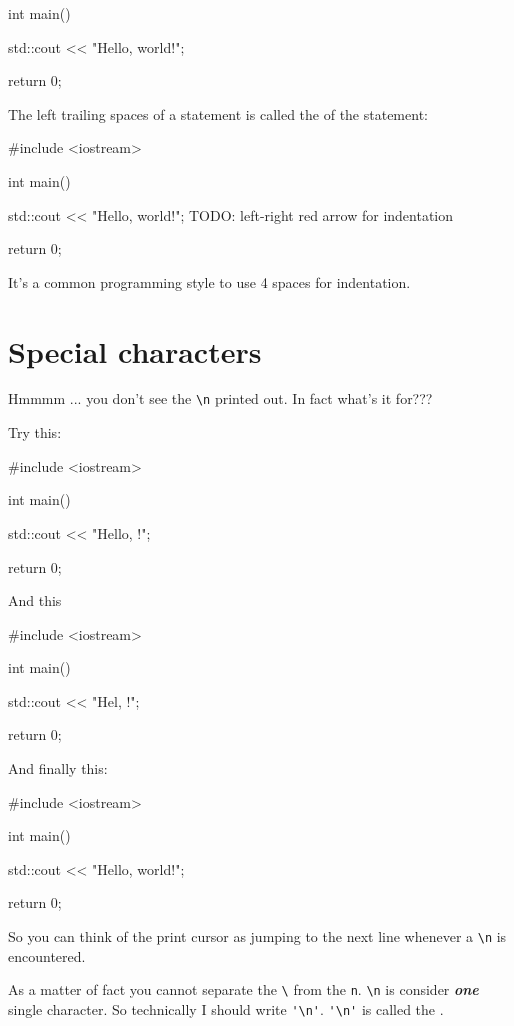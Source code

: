 \begin{console}[commandchars=\~\!\@]
\begin{console}
int main()
{
    std::cout << "Hello, world!\n";

    return 0;
}
\end{console}

The left trailing spaces of a statement is called the 
of the statement:
\begin{console}
#include <iostream>

int main()
{
    std::cout << "Hello, world!\n";
    TODO: left-right red arrow for indentation
 
    return 0;
}
\end{console}
It's a common programming style to use 4 spaces for indentation. 








\newpage\section{Special characters}


Hmmmm ... you don't see the \verb!\n! printed out. In fact what's it for???

Try this:
\begin{console}
#include <iostream>

int main()
{
    std::cout << "Hello, \nworld!\n";

    return 0;
}
\end{console}
And this
\begin{console}
#include <iostream>

int main()
{
    std::cout << "Hel\nlo, \nworld!\n";

    return 0;
}
\end{console}
And finally this:
\begin{console}
#include <iostream>

int main()
{
    std::cout << "Hello, world!";

    return 0;
}
\end{console} 
So you can think of the print cursor as jumping to the next line whenever a 
\verb!\n! is encountered. 

As a matter of fact you cannot separate the 
\verb!\! from the \verb!n!. 
\verb!\n! is consider \textit{\textbf{one}} single character. 
So technically I should write \verb!'\n'!. 
\verb!'\n'! is called the 
.




%



\end{console}
